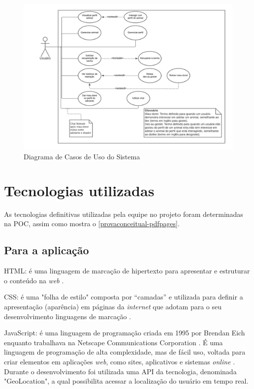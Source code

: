 \begin{figure}[!htbp]
    \centering
\includegraphics[scale=0.4,angle=90]{imagens/CasosDeUsoPETINDER.jpeg}
	\caption{\label{diagama-casos}Diagrama de Casos de Uso do Sistema}
\end{figure}

\section{Tecnologias utilizadas}
As tecnologias definitivas utilizadas pela equipe no projeto foram determinadas  na \ac{POC}, assim como mostra o \autoref{provaconceitual-pdfpages}.  
\subsection{Para a aplicação}
\ac{HTML}: é uma linguagem de marcação de hipertexto para apresentar e estruturar o conteúdo na \textit{web} \cite{html}.

\ac{CSS}: é uma "folha de estilo" composta por “camadas” e utilizada para definir a apresentação (aparência) em páginas da \textit{internet} que adotam para o seu desenvolvimento linguagens de marcação \cite{css}.

JavaScript: é uma linguagem de programação criada em 1995 por Brendan Eich enquanto trabalhava na Netscape Communications Corporation \cite{jsum}. É uma linguagem de programação de alta complexidade, mas de fácil uso, voltada para criar elementos em aplicações \textit{web}, como sites, aplicativos e sistemas \textit{online} \cite{jsdois}. 
Durante o desenvolvimento foi utilizada uma \ac{API} da tecnologia, denominada "GeoLocation", a qual possibilita acessar a localização do usuário em tempo real.

